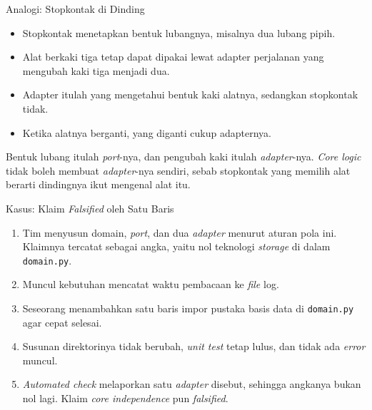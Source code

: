 \documentclass[aspectratio=169, table, 12pt]{beamer}
\begin{document}
\begin{frame}{{\Large Analogi: Stopkontak di Dinding}}
  \vspace{10pt}
  \begin{itemize}
    \item Stopkontak menetapkan bentuk lubangnya, misalnya dua lubang pipih.
    \item Alat berkaki tiga tetap dapat dipakai lewat adapter perjalanan yang
      mengubah kaki tiga menjadi dua.
    \item Adapter itulah yang mengetahui bentuk kaki alatnya, sedangkan
      stopkontak tidak.
    \item Ketika alatnya berganti, yang diganti cukup adapternya.
  \end{itemize}

  \vspace{10pt}
  {\small Bentuk lubang itulah \textit{port}-nya, dan pengubah kaki itulah
  \textit{adapter}-nya. \textit{Core logic} tidak boleh membuat
  \textit{adapter}-nya sendiri, sebab stopkontak yang memilih alat berarti
  dindingnya ikut mengenal alat itu.}
\end{frame}

\begin{frame}{{\Large Kasus: Klaim \textit{Falsified} oleh Satu Baris}}
  \vspace{8pt}
  \begin{enumerate}
    \item Tim menyusun domain, \textit{port}, dan dua \textit{adapter} menurut
      aturan pola ini. Klaimnya tercatat sebagai angka, yaitu nol teknologi
      \textit{storage} di dalam \texttt{domain.py}.
    \item Muncul kebutuhan mencatat waktu pembacaan ke \textit{file} log.
    \item Seseorang menambahkan satu baris impor pustaka basis data di
      \texttt{domain.py} agar cepat selesai.
    \item Susunan direktorinya tidak berubah, \textit{unit test} tetap lulus,
      dan tidak ada \textit{error} muncul.
    \item \textit{Automated check} melaporkan satu \textit{adapter} disebut,
      sehingga angkanya bukan nol lagi. Klaim \textit{core independence} pun
      \textit{falsified}.
  \end{enumerate}

\end{frame}
\end{document}
